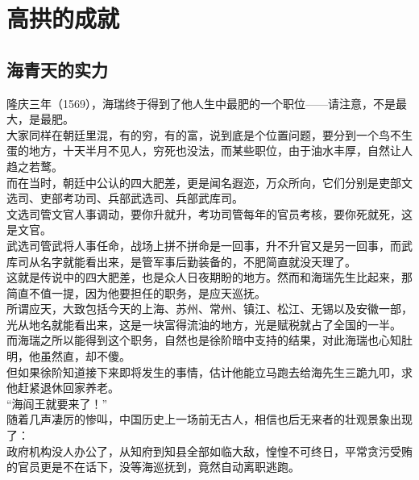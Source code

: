 \section{高拱的成就}
\ifnum{}
	\begin{multicols}{\theparacolNo}
\fi
\subsection{海青天的实力}
隆庆三年（1569），海瑞终于得到了他人生中最肥的一个职位——请注意，不是最大，是最肥。\\

大家同样在朝廷里混，有的穷，有的富，说到底是个位置问题，要分到一个鸟不生蛋的地方，十天半月不见人，穷死也没法，而某些职位，由于油水丰厚，自然让人趋之若鹜。\\

而在当时，朝廷中公认的四大肥差，更是闻名遐迩，万众所向，它们分别是吏部文选司、吏部考功司、兵部武选司、兵部武库司。\\

文选司管文官人事调动，要你升就升，考功司管每年的官员考核，要你死就死，这是文官。\\

武选司管武将人事任命，战场上拼不拼命是一回事，升不升官又是另一回事，而武库司从名字就能看出来，是管军事后勤装备的，不肥简直就没天理了。\\

这就是传说中的四大肥差，也是众人日夜期盼的地方。然而和海瑞先生比起来，那简直不值一提，因为他要担任的职务，是应天巡抚。\\

所谓应天，大致包括今天的上海、苏州、常州、镇江、松江、无锡以及安徽一部，光从地名就能看出来，这是一块富得流油的地方，光是赋税就占了全国的一半。\\

而海瑞之所以能得到这个职务，自然也是徐阶暗中支持的结果，对此海瑞也心知肚明，他虽然直，却不傻。\\

但如果徐阶知道接下来即将发生的事情，估计他能立马跑去给海先生三跪九叩，求他赶紧退休回家养老。\\

“海阎王就要来了！”\\

随着几声凄厉的惨叫，中国历史上一场前无古人，相信也后无来者的壮观景象出现了：\\

政府机构没人办公了，从知府到知县全部如临大敌，惶惶不可终日，平常贪污受贿的官员更是不在话下，没等海巡抚到，竟然自动离职逃跑。\\


\end{multicols}
